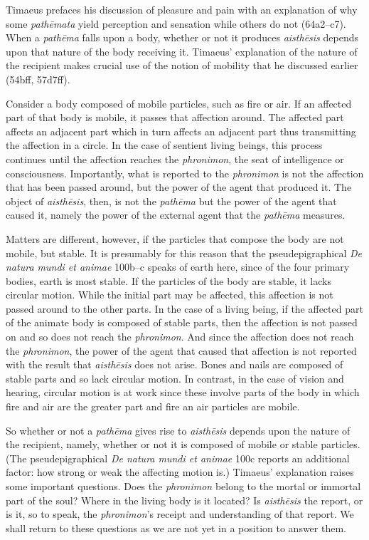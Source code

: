 Timaeus prefaces his discussion of pleasure and pain with an explanation of why some \emph{pathēmata} yield perception and sensation while others do not (64a2--c7). When a \emph{pathēma} falls upon a body, whether or not it produces \emph{aisthēsis} depends upon that nature of the body receiving it. Timaeus' explanation of the nature of the recipient makes crucial use of the notion of mobility that he discussed earlier (54bff, 57d7ff). 

Consider a body composed of mobile particles, such as fire or air. If an affected part of that body is mobile, it passes that affection around. The affected part affects an adjacent part which in turn affects an adjacent part thus transmitting the affection in a circle. In the case of sentient living beings, this process continues until the affection reaches the \emph{phronimon}, the seat of intelligence or consciousness. Importantly, what is reported to the \emph{phronimon} is not the affection that has been passed around, but the power of the agent that produced it. The object of \emph{aisthēsis}, then, is not the \emph{pathēma} but the power of the agent that caused it, namely the power of the external agent that the \emph{pathēma} measures.

Matters are different, however, if the particles that compose the body are not mobile, but stable. It is presumably for this reason that the pseudepigraphical \emph{De natura mundi et animae} 100b--c speaks of earth here, since of the four primary bodies, earth is most stable. If the particles of the body are stable, it lacks circular motion. While the initial part may be affected, this affection is not passed around to the other parts. In the case of a living being, if the affected part of the animate body is composed of stable parts, then the affection is not passed on and so does not reach the \emph{phronimon}. And since the affection does not reach the \emph{phronimon}, the power of the agent that caused that affection is not reported with the result that \emph{aisthēsis} does not arise. Bones and nails are composed of stable parts and so lack circular motion. In contrast, in the case of vision and hearing, circular motion is at work since these involve parts of the body in which fire and air are the greater part and fire an air particles are mobile.

So whether or not a \emph{pathēma} gives rise to \emph{aisthēsis} depends upon the nature of the recipient, namely, whether or not it is composed of mobile or stable particles. (The pseudepigraphical \emph{De natura mundi et animae} 100c reports an additional factor: how strong or weak the affecting motion is.) Timaeus' explanation raises some important questions. Does the \emph{phronimon} belong to the mortal or immortal part of the soul? Where in the living body is it located? Is \emph{aisthēsis} the report, or is it, so to speak, the \emph{phronimon}'s receipt and understanding of that report. We shall return to these questions as we are not yet in a position to answer them.

